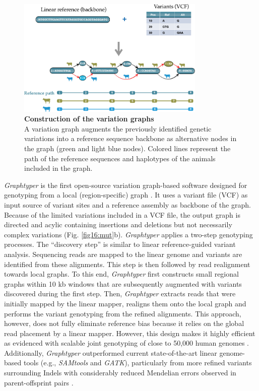 \documentclass[../main.tex]{subfiles}
\begin{document}
\begin{figure}[!htb]
    \centering
    \includegraphics[width=0.8\textwidth]{intro/fig5.pdf}
        \vspace{3mm}
        \caption[Construction of the variation graphs]{\textbf{Construction of the variation graphs} \\
        \footnotesize{A variation graph augments the previously identified genetic variations into a reference sequence backbone as alternative nodes in the graph (green and light blue nodes). Colored lines represent the path of the reference sequences and haplotypes of the animals included in the graph.}}
        \label{fig15:vargr}
\end{figure}


\emph{Graphtyper }is the first open-source variation graph-based software designed for genotyping from a local (region-specific) graph \citep{eggertsson2017graphtyper,eggertsson2019graphtyper2}. It uses a variant file (VCF) as input source of variant sites and a reference assembly as backbone of the graph. Because of the limited variations included in a VCF file, the output graph is directed and acylic containing insertions and deletions but not necessarily complex variations (Fig. \ref{fig16:mut}b). \emph{Graphtyper} applies a two-step genotyping processes. The  “discovery step” is similar to linear reference-guided variant analysis. Sequencing reads are mapped to the linear genome and variants are identified from these alignments. This step is then followed by read realignment towards local graphs. To this end, \emph{Graphtyper} first constructs small regional graphs within 10 kb windows that are subsequently augmented with variants discovered during the first step. Then, \emph{Graphtyper} extracts reads that were initially mapped by the linear mapper, realigns them onto the local graph and performs the variant genotyping from the refined alignments. This approach, however, does not  fully  eliminate reference bias because it relies on the global read placement by a linear mapper. However, this design makes it highly efficient as evidenced with scalable joint genotyping of close to 50,000 human genomes \citep{eggertsson2019graphtyper2}. Additionally, \emph{Graphtyper} outperformed current state-of-the-art linear genome-based tools (e.g., \emph{SAMtools} and \emph{GATK}), particularly from more refined variants surrounding Indels with considerably reduced Mendelian errors observed in parent-offsprint pairs \citep{eggertsson2017graphtyper}.
\end{document}
